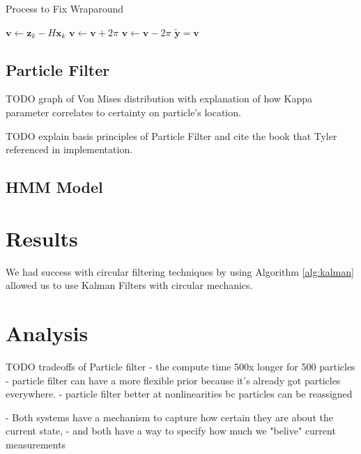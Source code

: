\documentclass[11pt]{amsart}
\begin{document}
\begin{algorithm}
    \caption{Process to Fix Wraparound}\label{alg:kalman}    
    \begin{algorithmic}
        \State $\mathbf{v} \gets \mathbf{z}_k - H\mathbf{x}_k$
            \State $\mathbf{v} \gets \mathbf{v} + 2\pi$
            \State $\mathbf{v} \gets \mathbf{v} - 2\pi$
        \EndIf 
        \State $\tilde{\mathbf{y}} = \mathbf{v}$ 
        \end{algorithmic}
    \end{algorithm}


\subsection{Particle Filter}

TODO graph of Von Mises distribution with explanation of how Kappa parameter 
correlates to certainty on particle's location.

TODO explain basis principles of Particle Filter and cite the book
that Tyler referenced in implementation.

\subsection{HMM Model}

\section{Results}

We had success with circular filtering techniques by using Algorithm \ref{alg:kalman} allowed us to use Kalman Filters with circular mechanics.


\section{Analysis}

TODO tradeoffs of Particle filter - the compute time 500x longer for 500 particles
- particle filter can have a more flexible prior because it's already got particles everywhere.
- particle filter better at nonlinearities bc particles can be reassigned

- Both systems have a mechanism to capture how certain they are about the current state,
- and both have a way to specify how much we "belive" current measurements
\end{document}
